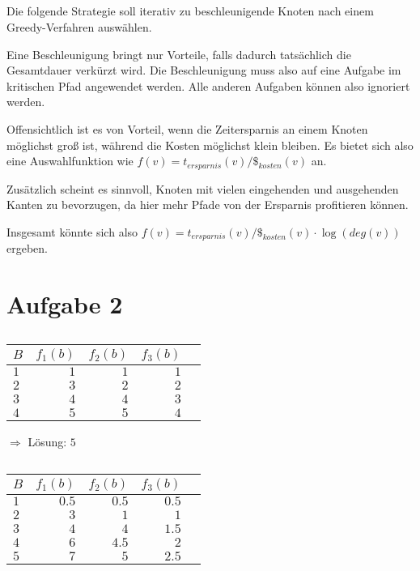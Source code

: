 \documentclass[a4paper]{article}
\begin{document}
\subsection{}
Die folgende Strategie soll iterativ zu beschleunigende Knoten nach einem
Greedy-Verfahren auswählen.

Eine Beschleunigung bringt nur Vorteile, falls dadurch tatsächlich die
Gesamtdauer verkürzt wird. Die Beschleunigung muss also auf eine Aufgabe im
kritischen Pfad angewendet werden. Alle anderen Aufgaben können also
ignoriert werden.

Offensichtlich ist es von Vorteil, wenn die Zeitersparnis an einem Knoten
möglichst groß ist, während die Kosten möglichst klein bleiben.
Es bietet sich also eine Auswahlfunktion wie $f(v) = t_{ersparnis}(v) /
\$_{kosten}(v)$ an.

Zusätzlich scheint es sinnvoll, Knoten mit vielen eingehenden und
ausgehenden Kanten zu bevorzugen, da hier mehr Pfade von der Ersparnis
profitieren können.

Insgesamt könnte sich also $f(v) = t_{ersparnis}(v) /
\$_{kosten}(v) \cdot \log(deg(v))$ ergeben.

\section{Aufgabe 2}
\subsection{}
\begin{tabular}{l|rrrr}
$B$ & $f_1(b)$ & $f_2(b)$ & $f_3(b)$ \\
\hline
$1$ & $1$ & $1$ & $1$  \\
$2$ & $3$ & $2$ & $2$  \\
$3$ & $4$ & $4$ & $3$  \\
$4$ & $5$ & $5$ & $4$  \\
\end{tabular}

$\Rightarrow$ Lösung: $5$

\subsection{}

\begin{tabular}{l|rrrr}
$B$ & $f_1(b)$ & $f_2(b)$ & $f_3(b)$ \\
\hline
$1$ & $0.5$ & $0.5$ & $0.5$  \\
$2$ & $3$ & $1$ & $1$  \\
$3$ & $4$ & $4$ & $1.5$  \\
$4$ & $6$ & $4.5$ & $2$  \\
$5$ & $7$ & $5$ & $2.5$  \\
\end{tabular}
\end{document}
